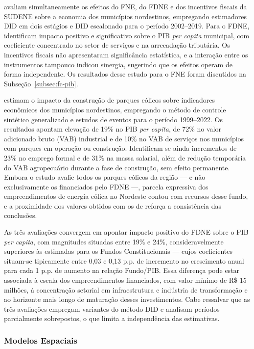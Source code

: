  avaliam simultaneamente os efeitos do FNE, do FDNE e dos incentivos fiscais da SUDENE sobre a economia dos municípios nordestinos, empregando estimadores DID em dois estágios e DID escalonado para o período 2002--2019. Para o FDNE, identificam impacto positivo e significativo sobre o PIB \textit{per capita} municipal, com coeficiente concentrado no setor de serviços e na arrecadação tributária. Os incentivos fiscais não apresentaram significância estatística, e a interação entre os instrumentos tampouco indicou sinergia, sugerindo que os efeitos operam de forma independente. Os resultados desse estudo para o FNE foram discutidos na Subseção~\ref{subsec:fc-pib}.

 estimam o impacto da construção de parques eólicos sobre indicadores econômicos dos municípios nordestinos, empregando o método de controle sintético generalizado e estudos de eventos para o período 1999--2022. Os resultados apontam elevação de 19\% no PIB \textit{per capita}, de 72\% no valor adicionado bruto (VAB) industrial e de 10\% no VAB de serviços nos municípios com parques em operação ou construção. Identificam-se ainda incrementos de 23\% no emprego formal e de 31\% na massa salarial, além de redução temporária do VAB agropecuário durante a fase de construção, sem efeito permanente. Embora o estudo avalie todos os parques eólicos da região --- e não exclusivamente os financiados pelo FDNE ---, parcela expressiva dos empreendimentos de energia eólica no Nordeste contou com recursos desse fundo, e a proximidade dos valores obtidos com os de  reforça a consistência das conclusões.

As três avaliações convergem em apontar impacto positivo do FDNE sobre o PIB \textit{per capita}, com magnitudes situadas entre 19\% e 24\%, consideravelmente superiores às estimadas para os Fundos Constitucionais --- cujos coeficientes situam-se tipicamente entre 0,03 e 0,13 p.p. de incremento no crescimento anual para cada 1 p.p. de aumento na relação Fundo/PIB. Essa diferença pode estar associada à escala dos empreendimentos financiados, com valor mínimo de R\$ 15 milhões, à concentração setorial em infraestrutura e indústria de transformação e ao horizonte mais longo de maturação desses investimentos. Cabe ressalvar que as três avaliações empregam variantes do método DID e analisam períodos parcialmente sobrepostos, o que limita a independência das estimativas.

\subsubsection{Modelos Espaciais}

